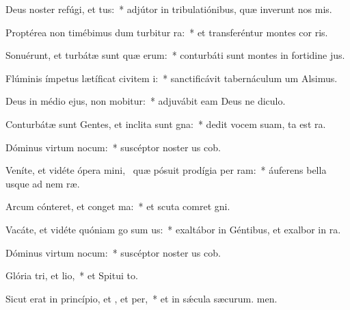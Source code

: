 \item Deus noster refúgi, et tus:~* adjútor in tribulatiónibus, quæ inverunt nos mis.
\item Proptérea non timébimus dum turbitur ra:~* et transferéntur montes  cor ris.
\item Sonuérunt, et turbátæ sunt quæ erum:~* conturbáti sunt montes in fortidine jus.
\item Flúminis ímpetus lætíficat civitem i:~* sanctificávit tabernáculum um Alsimus.
\item Deus in médio ejus, non mobitur:~* adjuvábit eam Deus ne diculo.
\item Conturbátæ sunt Gentes, et inclita sunt gna:~* dedit vocem suam, ta est ra.
\item Dóminus virtum nocum:~* suscéptor noster us cob.
\item Veníte, et vidéte ópera mini,~\pscross{} quæ pósuit prodígia per ram:~* áuferens bella usque ad nem ræ.
\item Arcum cónteret, et conget ma:~* et scuta comret gni.
\item Vacáte, et vidéte quóniam go sum us:~* exaltábor in Géntibus, et exalbor in ra.
\item Dóminus virtum nocum:~* suscéptor noster us cob.
\item Glória tri, et lio,~* et Spitui to.
\item Sicut erat in princípio, et , et per,~* et in sǽcula sæcurum. men.
